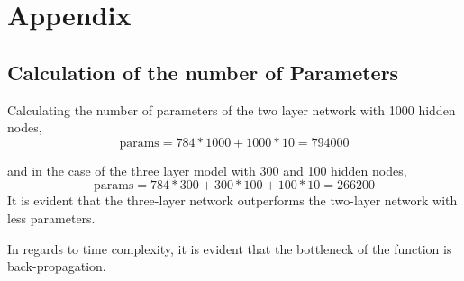 \documentclass[12pt, twocolumn]{article}
\begin{document}


\section{Appendix}
\subsection{Calculation of the number of Parameters}
 Calculating the number of parameters of the two layer network with 1000 hidden nodes, 
\begin{equation*}
\textrm{params} = 784*1000 + 1000* 10 = 794000
\end{equation*}

and in the case of the three layer model with 300 and 100 hidden nodes,
\begin{equation*}
\textrm{params} = 784*300 + 300*100 + 100* 10 = 266200
\end{equation*}
It is evident that the three-layer network outperforms the two-layer network with less parameters. 

In regards to time complexity, it is evident that the bottleneck of the function is back-propagation. 
\end{document}
